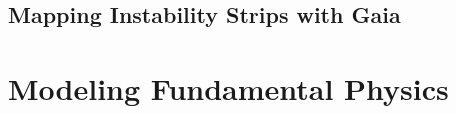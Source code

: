 


{\color{brown}
\subsection{Mapping Instability Strips with Gaia}


}








\section{Modeling Fundamental Physics}
